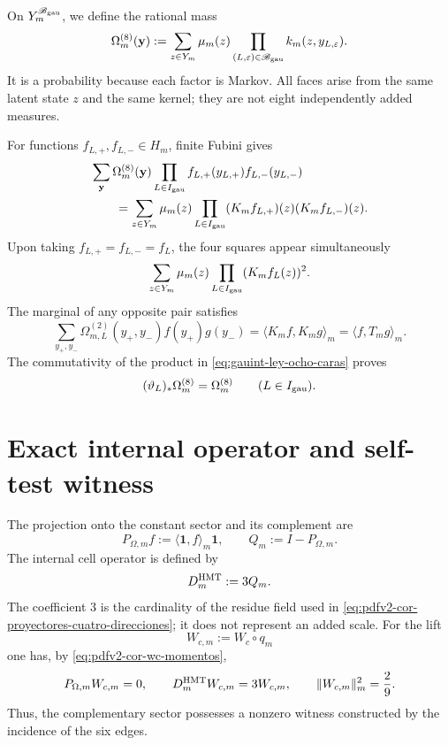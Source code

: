 On \(Y_m^{\mathscr B_{\rm gau}}\), we define the rational mass
\begin{equation}\label{eq:gauint-ley-ocho-caras}
 \Omega_m^{(8)}(\mathbf y)
 :=\sum_{z\in Y_m}\mu_m(z)
 \prod_{(L,\varepsilon)\in\mathscr B_{\rm gau}}
 k_m(z,y_{L,\varepsilon}).
\end{equation}
It is a probability because each factor is Markov. All faces arise
from the same latent state \(z\) and the same kernel; they are not eight independently
added measures.

For functions \(f_{L,+},f_{L,-}\in H_m\), finite Fubini gives
\begin{equation}\label{eq:gauint-fubini-ocho}
\begin{aligned}
 &\sum_{\mathbf y}\Omega_m^{(8)}(\mathbf y)
  \prod_{L\in I_{\rm gau}}
  f_{L,+}(y_{L,+})f_{L,-}(y_{L,-})\\
 &\qquad=
 \sum_{z\in Y_m}\mu_m(z)
 \prod_{L\in I_{\rm gau}}
 (K_mf_{L,+})(z)(K_mf_{L,-})(z).
\end{aligned}
\end{equation}
Upon taking \(f_{L,+}=f_{L,-}=f_L\), the four squares appear
simultaneously
\begin{equation}\label{eq:gauint-cuatro-cuadrados}
 \sum_{z\in Y_m}\mu_m(z)
 \prod_{L\in I_{\rm gau}}(K_mf_L(z))^2.
\end{equation}
The marginal of any opposite pair satisfies
\begin{equation}\label{eq:gauint-marginal-t}
 \sum_{y_+,y_-}\Omega_{m,L}^{(2)}(y_+,y_-)
 f(y_+)g(y_-)
 =\langle K_mf,K_mg\rangle_m
 =\langle f,T_mg\rangle_m.
\end{equation}
The commutativity of the product in \eqref{eq:gauint-ley-ocho-caras} proves
\begin{equation}\label{eq:gauint-involuciones-ley}
 (\vartheta_L)_*\Omega_m^{(8)}=\Omega_m^{(8)}
 \qquad(L\in I_{\rm gau}).
\end{equation}

\section{Exact internal operator and self-test witness}

The projection onto the constant sector and its complement are
\begin{equation}\label{eq:gauint-pq}
 P_{\Omega,m}f:=\langle\mathbf1,f\rangle_m\mathbf1,
 \qquad
 Q_m:=I-P_{\Omega,m}.
\end{equation}
The internal cell operator is defined by
\begin{equation}\label{eq:gauint-d-hmt}
 D_m^{\rm HMT}:=3Q_m.
\end{equation}
The coefficient \(3\) is the cardinality of the residue field used in
\eqref{eq:pdfv2-cor-proyectores-cuatro-direcciones}; it does not represent an
added scale.
For the lift
\[
 W_{c,m}:=W_c\circ q_m
\]
one has, by \eqref{eq:pdfv2-cor-wc-momentos},
\begin{equation}\label{eq:gauint-w-eigen}
 P_{\Omega,m}W_{c,m}=0,
 \qquad
 D_m^{\rm HMT}W_{c,m}=3W_{c,m},
 \qquad
 \|W_{c,m}\|_m^2=\frac29.
\end{equation}
Thus, the complementary sector possesses a nonzero witness constructed by the
incidence of the six edges.

